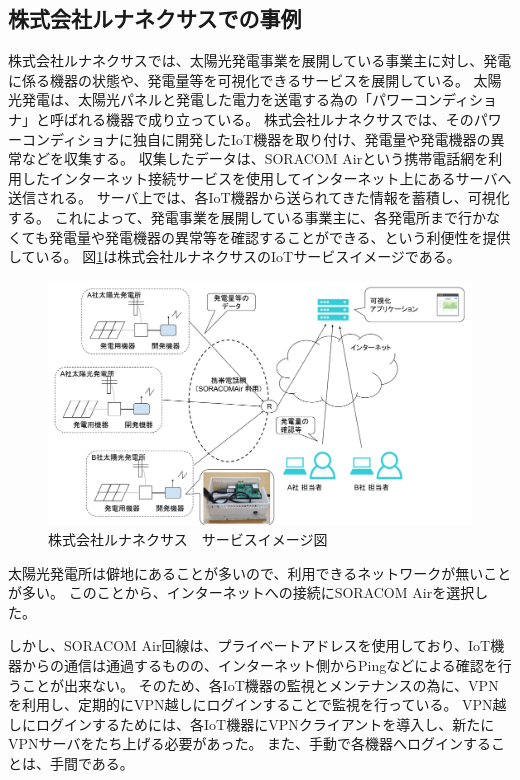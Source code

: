 \subsection{株式会社ルナネクサスでの事例}
株式会社ルナネクサスでは、太陽光発電事業を展開している事業主に対し、発電に係る機器の状態や、発電量等を可視化できるサービスを展開している。
太陽光発電は、太陽光パネルと発電した電力を送電する為の「パワーコンディショナ」と呼ばれる機器で成り立っている。
株式会社ルナネクサスでは、そのパワーコンディショナに独自に開発したIoT機器を取り付け、発電量や発電機器の異常などを収集する。
収集したデータは、SORACOM Airという携帯電話網を利用したインターネット接続サービスを使用してインターネット上にあるサーバへ送信される。
サーバ上では、各IoT機器から送られてきた情報を蓄積し、可視化する。
これによって、発電事業を展開している事業主に、各発電所まで行かなくても発電量や発電機器の異常等を確認することができる、という利便性を提供している。
図\ref{fig:lunafig}は株式会社ルナネクサスのIoTサービスイメージである。
\begin{figure}[htbp]
\includegraphics[width=16cm]{images/lunafig.png}
\caption{株式会社ルナネクサス　サービスイメージ図}
\label{fig:lunafig}
\end{figure}
太陽光発電所は僻地にあることが多いので、利用できるネットワークが無いことが多い。
このことから、インターネットへの接続にSORACOM Airを選択した。

しかし、SORACOM Air回線は、プライベートアドレスを使用しており、IoT機器からの通信は通過するものの、インターネット側からPingなどによる確認を行うことが出来ない。
そのため、各IoT機器の監視とメンテナンスの為に、VPNを利用し、定期的にVPN越しにログインすることで監視を行っている。
VPN越しにログインするためには、各IoT機器にVPNクライアントを導入し、新たにVPNサーバをたち上げる必要があった。
また、手動で各機器へログインすることは、手間である。

